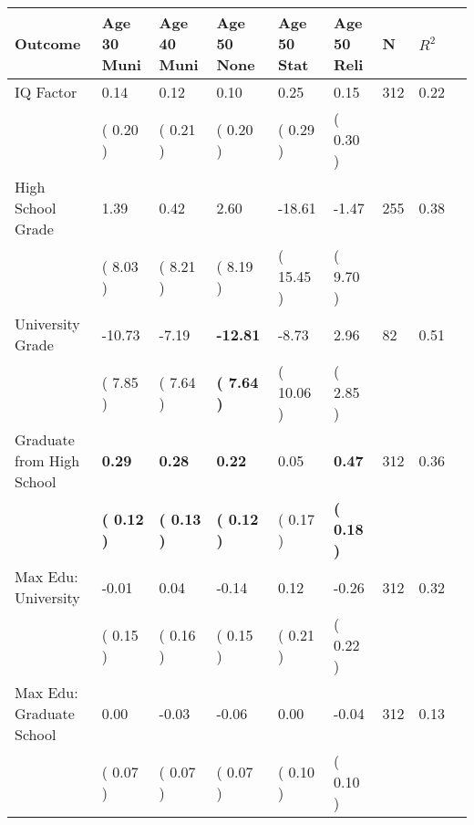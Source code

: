 \begin{tabular}{L{6.2cm} C{1.8cm} C{1.8cm} C{1.8cm} C{1.8cm} C{1.8cm} C{1.8cm} C{0.3cm} C{0.3cm}}
\toprule
 \textbf{Outcome} & \textbf{Age 30 Muni} & \textbf{Age 40 Muni} & \textbf{Age 50 None} & \textbf{Age 50 Stat} & \textbf{Age 50 Reli} & \textbf{N} & \textbf{$ R^2$} \\
\midrule
IQ Factor &      0.14 &      0.12 &      0.10 &      0.25 &      0.15  & 312 &       0.22 \\ 
 & (     0.20 ) & (     0.21 ) & (     0.20 ) & (     0.29 ) & (     0.30 )  & \\
High School Grade &      1.39 &      0.42 &      2.60 &    -18.61 &     -1.47  & 255 &       0.38 \\ 
 & (     8.03 ) & (     8.21 ) & (     8.19 ) & (    15.45 ) & (     9.70 )  & \\
University Grade &    -10.73 &     -7.19 & \textbf{   -12.81} &     -8.73 &      2.96  & 82 &       0.51 \\ 
 & (     7.85 ) & (     7.64 ) & \textbf{(     7.64 )} & (    10.06 ) & (     2.85 )  & \\
Graduate from High School & \textbf{     0.29} & \textbf{     0.28} & \textbf{     0.22} &      0.05 & \textbf{     0.47}  & 312 &       0.36 \\ 
 & \textbf{(     0.12 )} & \textbf{(     0.13 )} & \textbf{(     0.12 )} & (     0.17 ) & \textbf{(     0.18 )}  & \\
Max Edu: University &     -0.01 &      0.04 &     -0.14 &      0.12 &     -0.26  & 312 &       0.32 \\ 
 & (     0.15 ) & (     0.16 ) & (     0.15 ) & (     0.21 ) & (     0.22 )  & \\
Max Edu: Graduate School &      0.00 &     -0.03 &     -0.06 &      0.00 &     -0.04  & 312 &       0.13 \\ 
 & (     0.07 ) & (     0.07 ) & (     0.07 ) & (     0.10 ) & (     0.10 )  & \\
\bottomrule
\end{tabular}
